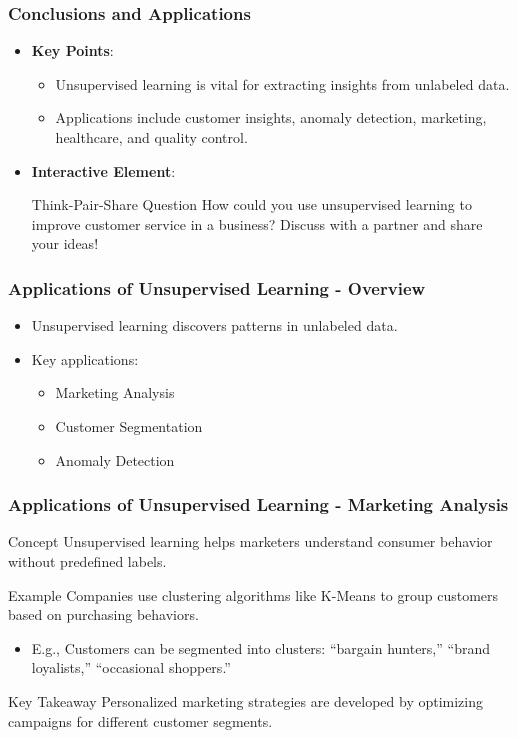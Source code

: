 \documentclass[aspectratio=169]{beamer}
\begin{document}
\begin{frame}[fragile]
    \frametitle{Conclusions and Applications}
    \begin{itemize}
        \item \textbf{Key Points}:
        \begin{itemize}
            \item Unsupervised learning is vital for extracting insights from unlabeled data.
            \item Applications include customer insights, anomaly detection, marketing, healthcare, and quality control.
        \end{itemize}
        \item \textbf{Interactive Element}:
            \begin{block}{Think-Pair-Share Question}
                How could you use unsupervised learning to improve customer service in a business? Discuss with a partner and share your ideas!
            \end{block}
    \end{itemize}
\end{frame}

\begin{frame}[fragile]
    \frametitle{Applications of Unsupervised Learning - Overview}
    \begin{itemize}
        \item Unsupervised learning discovers patterns in unlabeled data.
        \item Key applications:
        \begin{itemize}
            \item Marketing Analysis
            \item Customer Segmentation
            \item Anomaly Detection
        \end{itemize}
    \end{itemize}
\end{frame}

\begin{frame}[fragile]
    \frametitle{Applications of Unsupervised Learning - Marketing Analysis}
    \begin{block}{Concept}
        Unsupervised learning helps marketers understand consumer behavior without predefined labels.
    \end{block}
    
    \begin{block}{Example}
        Companies use clustering algorithms like K-Means to group customers based on purchasing behaviors.
        \begin{itemize}
            \item E.g., Customers can be segmented into clusters: “bargain hunters,” “brand loyalists,” “occasional shoppers.”
        \end{itemize}
    \end{block}
    
    \begin{block}{Key Takeaway}
        Personalized marketing strategies are developed by optimizing campaigns for different customer segments.
    \end{block}
\end{frame}
\end{document}
